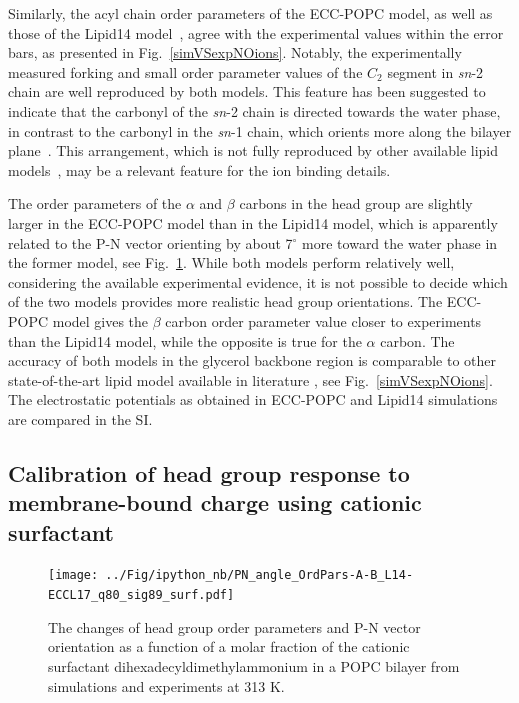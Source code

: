 \documentclass[journal=jpcbfk,manuscript=article]{achemso}
\begin{document}
Similarly, the acyl chain order parameters of the ECC-POPC model, as well as those of the Lipid14 model~\cite{dickson14}, agree with the experimental values within the error bars, as presented in Fig.~\ref{simVSexpNOions}. Notably, the experimentally measured forking and small order parameter values of the $C_2$ segment in {\it sn}-2 chain are well reproduced by both models. This feature has been suggested to indicate that the carbonyl of the {\it sn}-2 chain is directed towards the water phase, in contrast to the carbonyl in the {\it sn}-1 chain, which orients more along the bilayer plane~\cite{seelig75,schindler75,gawrisch92}.
This arrangement, which is not fully reproduced by other available lipid models~\cite{ollila16}, may be a relevant feature for the ion binding details.

The order parameters of the $\alpha$ and $\beta$ carbons in the head group are slightly larger in the ECC-POPC model than in the Lipid14 model, which is apparently related to the P-N vector orienting by about 7$^{\circ}$ more toward the water phase in the former model, see Fig.~\ref{OrderParameterCHANGESsurf}. While both models perform relatively well, considering the available experimental evidence, it is not possible to decide which of the two models provides more realistic head group orientations. The ECC-POPC model gives the $\beta$ carbon order parameter value closer to experiments than the Lipid14 model, while the opposite is true for the $\alpha$ carbon. The accuracy of both models in the glycerol backbone region is comparable to other state-of-the-art lipid model available in literature \cite{botan15}, see Fig.~\ref{simVSexpNOions}.
The electrostatic potentials as obtained in ECC-POPC and Lipid14 simulations are compared in the SI.


\subsection{Calibration of head group response to membrane-bound charge using cationic surfactant}\label{section:boundCHARGE}

\begin{figure}[tb!]
  \centering
  \texttt{[image: ../Fig/ipython\_nb/PN\_angle\_OrdPars-A-B\_L14-ECCL17\_q80\_sig89\_surf.pdf]}
  \caption{\label{OrderParameterCHANGESsurf}
    The changes of head group order parameters and P-N vector orientation as a function of
    a molar fraction of the cationic surfactant dihexadecyldimethylammonium in a POPC bilayer
    from simulations and experiments \cite{scherer89} at 313 K.
  }
\end{figure}
\end{document}
